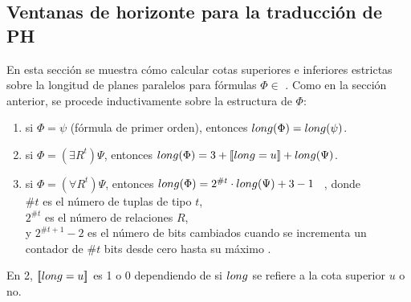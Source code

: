 \subsection{Ventanas de horizonte para la traducción de PH}

En esta sección se muestra cómo calcular cotas superiores e inferiores estrictas
sobre la longitud de planes paralelos para fórmulas $\Phi \in$ \LSO.
Como en la sección anterior, se procede inductivamente sobre la estructura de $\Phi$:
\begin{enumerate}[1.]
\item si $\Phi=\psi$ (fórmula de primer orden), entonces $long(\Phi)=long(\psi)$.
\item si $\Phi=(\exists R^t)\Psi$, entonces $long(\Phi)=3+[\![long=u]\!]+long(\Psi)$.
\item si $\Phi=(\forall R^t)\Psi$, entonces
  $long(\Phi)=2^{\#t} \cdot long(\Psi)+3 - 1 $%
\ , donde\\
  $\#t$ es el número de tuplas de tipo $t$,\\ 
  $2^{\#t}$ es el número de relaciones $R$, \\
  y $2^{\#t+1}-2$ es el número de bits cambiados cuando se incrementa un
contador de $\#t$ bits desde cero hasta su máximo \citep{cormen:algorithms}.
\end{enumerate}
En 2, $[\![long=u]\!]$ es 1 o 0 dependiendo de si $long$ se refiere a la cota
superior $u$ o no.

